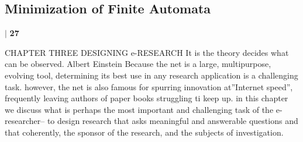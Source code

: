 \documentclass[a4,9pt]{beamer}
\begin{document}
\begin{frame}
\section*{Minimization of Finite Automata}
\begin{flushright}
 \texttt{} \hspace*{0.1cm}\textbf{$|$} \hspace*{0.1cm} \textbf{27}\hspace*{0.1cm}
\end{flushright}
\vspace*{1cm}
CHAPTER THREE
DESIGNING e-RESEARCH
It is the theory decides what can be observed. Albert Einstein
Because the net is a large, multipurpose, evolving tool, determining its best use in
any research application is a challenging task. however, the net is also famous for
spurring innovation at”Internet speed”, frequently leaving authors of paper books
struggling ti keep up. in this chapter we discuss what is perhaps the most important
and challenging task of the e-researcher– to design research that asks meaningful and
answerable questions and that coherently, the sponsor of the research, and the subjects
of investigation.
\end{frame}
\end{document}
